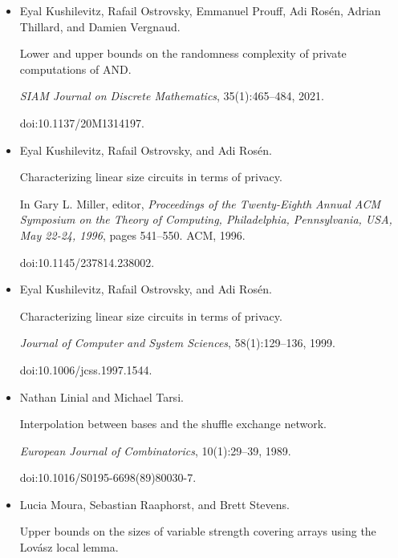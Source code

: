 \documentclass[10pt,a4paper]{article}
\begin{document}
\begin{itemize}
\item[] 
[13]

Eyal Kushilevitz, Rafail Ostrovsky, Emmanuel Prouff, Adi Rosén, Adrian
Thillard, and Damien Vergnaud.


Lower and upper bounds on the randomness complexity of private
computations of AND.


\emph{SIAM Journal on Discrete Mathematics}, 35(1):465–484, 2021.


doi:10.1137/20M1314197.





\item[] 
[14]

Eyal Kushilevitz, Rafail Ostrovsky, and Adi Rosén.


Characterizing linear size circuits in terms of privacy.


In Gary L. Miller, editor, \emph{Proceedings of the Twenty-Eighth
Annual ACM Symposium on the Theory of Computing, Philadelphia,
Pennsylvania, USA, May 22-24, 1996}, pages 541–550. ACM, 1996.


doi:10.1145/237814.238002.





\item[] 
[15]

Eyal Kushilevitz, Rafail Ostrovsky, and Adi Rosén.


Characterizing linear size circuits in terms of privacy.


\emph{Journal of Computer and System Sciences}, 58(1):129–136, 1999.


doi:10.1006/jcss.1997.1544.





\item[] 
[16]

Nathan Linial and Michael Tarsi.


Interpolation between bases and the shuffle exchange network.


\emph{European Journal of Combinatorics}, 10(1):29–39, 1989.


doi:10.1016/S0195-6698(89)80030-7.





\item[] 
[17]

Lucia Moura, Sebastian Raaphorst, and Brett Stevens.


Upper bounds on the sizes of variable strength covering arrays using
the Lovász local lemma.



\end{itemize}
\end{document}
